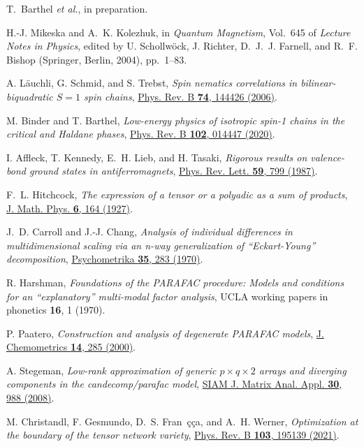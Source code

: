 \documentclass[english,11pt,aps,pra,onecolumn,tightenlines,groupedaddress,superscriptaddress,notitlepage,floatfix,fleqn]{revtex4-1}
\begin{document}
\begin{thebibliography}{10}
T.\ Barthel \protect \emph {et al.}, in preparation.

H.-J. Mikeska and A.~K. Kolezhuk,  in {\em Quantum Magnetism}, Vol.~645 of {\em
  Lecture Notes in Physics}, edited by U. Schollw\"ock, J. Richter, D.~J.~J.
  Farnell, and R.~F. Bishop (Springer, Berlin, 2004), pp.\ 1--83.

A. L\"auchli, G. Schmid, and S. Trebst, {\em Spin nematics correlations in
  bilinear-biquadratic $S=1$ spin chains},
  \href{https://doi.org/10.1103/PhysRevB.74.144426} {Phys. Rev. B {\bf 74},
  144426  (2006)}.

M. Binder and T. Barthel, {\em Low-energy physics of isotropic spin-1 chains in
  the critical and Haldane phases},
  \href{https://doi.org/10.1103/PhysRevB.102.014447} {Phys. Rev. B {\bf 102},
  014447  (2020)}.

I. Affleck, T. Kennedy, E.~H. Lieb, and H. Tasaki, {\em Rigorous results on
  valence-bond ground states in antiferromagnets},
  \href{https://doi.org/10.1103/PhysRevLett.59.799} {Phys. Rev. Lett. {\bf 59},
   799  (1987)}.

F.~L. Hitchcock, {\em The expression of a tensor or a polyadic as a sum of
  products}, \href{https://doi.org/10.1002/sapm192761164} {J. Math. Phys. {\bf
  6},  164  (1927)}.

J.~D. Carroll and J.-J. Chang, {\em Analysis of individual differences in
  multidimensional scaling via an n-way generalization of ``Eckart-Young''
  decomposition}, \href{https://doi.org/10.1007/BF02310791} {Psychometrika {\bf
  35},  283  (1970)}.

R. Harshman, {\em Foundations of the PARAFAC procedure: Models and conditions
  for an ``explanatory'' multi-modal factor analysis}, {UCLA working papers in
  phonetics {\bf 16},  1  (1970)}.

P. Paatero, {\em Construction and analysis of degenerate PARAFAC models},
  \href{https://doi.org/10.1002/1099-128X(200005/06)14:3<285::AID-CEM584>3.0.CO;2-1}
  {J. Chemometrics {\bf 14},  285  (2000)}.

A. Stegeman, {\em Low-rank approximation of generic $p \times q \times 2$
  arrays and diverging components in the candecomp/parafac model},
  \href{https://doi.org/10.1137/050644677} {SIAM J. Matrix Anal. Appl. {\bf
  30},  988  (2008)}.

M. Christandl, F. Gesmundo, D.~S. Fran\ifmmode~\mbox{\c{c}}\else \c{c}\fi{}a,
  and A.~H. Werner, {\em Optimization at the boundary of the tensor network
  variety}, \href{https://doi.org/10.1103/PhysRevB.103.195139} {Phys. Rev. B
  {\bf 103},  195139  (2021)}.

\end{thebibliography}
\end{document}
